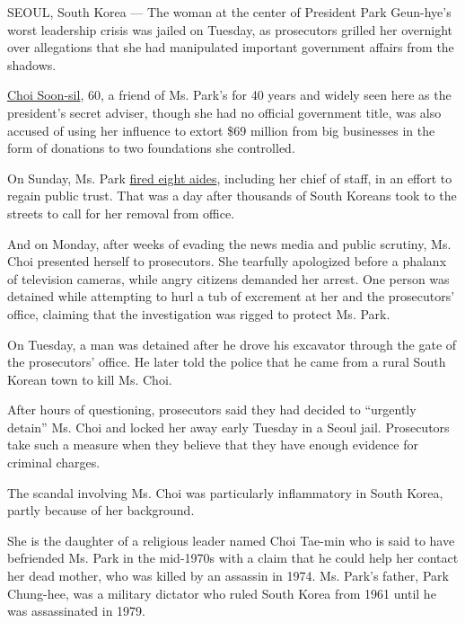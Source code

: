 SEOUL, South Korea --- The woman at the center of President Park
Geun-hye's worst leadership crisis was jailed on Tuesday, as prosecutors
grilled her overnight over allegations that she had manipulated
important government affairs from the shadows.

\href{http://www.nytimes.com/2016/10/28/world/asia/south-korea-choi-soon-sil.html}{Choi
Soon-sil}, 60, a friend of Ms. Park's for 40 years and widely seen here
as the president's secret adviser, though she had no official government
title, was also accused of using her influence to extort \$69 million
from big businesses in the form of donations to two foundations she
controlled.

On Sunday, Ms. Park
\href{http://www.nytimes.com/2016/10/31/world/asia/south-korea-choi-soon-sil.html?rref=collection\%2Ftimestopic\%2FSouth\%20Korea\&action=click\&contentCollection=world\&region=stream\&module=stream_unit\&version=latest\&contentPlacement=1\&pgtype=collection}{fired
eight aides}, including her chief of staff, in an effort to regain
public trust. That was a day after thousands of South Koreans took to
the streets to call for her removal from office.

And on Monday, after weeks of evading the news media and public
scrutiny, Ms. Choi presented herself to prosecutors. She tearfully
apologized before a phalanx of television cameras, while angry citizens
demanded her arrest. One person was detained while attempting to hurl a
tub of excrement at her and the prosecutors' office, claiming that the
investigation was rigged to protect Ms. Park.

On Tuesday, a man was detained after he drove his excavator through the
gate of the prosecutors' office. He later told the police that he came
from a rural South Korean town to kill Ms. Choi.

After hours of questioning, prosecutors said they had decided to
``urgently detain'' Ms. Choi and locked her away early Tuesday in a
Seoul jail. Prosecutors take such a measure when they believe that they
have enough evidence for criminal charges.

The scandal involving Ms. Choi was particularly inflammatory in South
Korea, partly because of her background.

She is the daughter of a religious leader named Choi Tae-min who is said
to have befriended Ms. Park in the mid-1970s with a claim that he could
help her contact her dead mother, who was killed by an assassin in 1974.
Ms. Park's father, Park Chung-hee, was a military dictator who ruled
South Korea from 1961 until he was assassinated in 1979.


